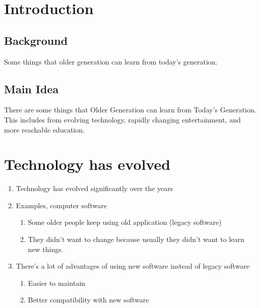 \documentclass[a4paper, 12pt]{article}
\begin{document}
    \section{Introduction}
    \subsection{Background}
        Some things that older generation can learn from today's generation.

    \subsection{Main Idea}
        There are some things that Older Generation can learn from Today's Generation. \\
        This includes from evolving technology, rapidly changing entertainment, and more reachable education.

    \section{Technology has evolved}
        \begin{enumerate}
            \item Technology has evolved significantly over the years
            \item Examples, computer software
            \begin{enumerate}[label*=\arabic*.]
                \item Some older people keep using old application (legacy software)
                \item They didn't want to change because usually they didn't want to learn new things.
            \end{enumerate}
            \item There's a lot of advantages of using new software instead of legacy software
            \begin{enumerate}[label*=\arabic*.]
                \item Easier to maintain
                \item Better compatibility with new software
            \end{enumerate}
        \end{enumerate}
\end{document}
